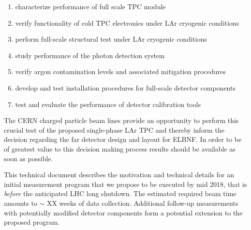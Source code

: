 \begin{enumerate}
 \item characterize performance of full scale TPC module
 \item verify functionality of cold TPC electronics under LAr cryogenic conditions
 \item perform full-scale structural test under LAr cryogenic conditions
 \item study performance of the photon detection system
 \item verify argon contamination levels and associated mitigation procedures
 \item develop and test installation procedures for full-scale detector components
 \item test and evaluate the performance of detector calibration tools
\end{enumerate}


The CERN charged particle beam lines provide an opportunity to perform this crucial test of the 
proposed single-phase LAr TPC and thereby inform the decision regarding the far detector design and layout for ELBNF.
In order to be of greatest value to this decision making process results should be available as soon as possible.

This technical document describes the motivation and technical details for an initial  measurement program that we propose to be executed by mid 2018, 
that is {\it before} the anticipated LHC long shutdown. The estimated required beam time amounts to $\sim$ XX weeks of data collection. 
%
Additional follow-up measurements with potentially modified detector components form a potential extension to the proposed program.




